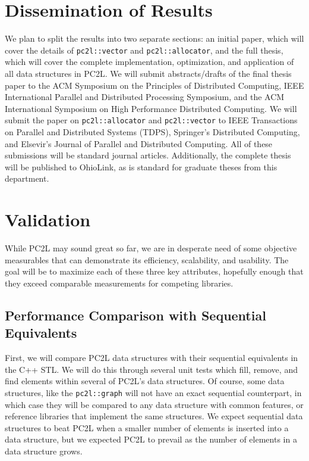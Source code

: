 \section{Dissemination of Results}
We plan to split the results into two separate sections: an initial paper, which will cover the details of \texttt{pc2l::vector} and \texttt{pc2l::allocator}, and the full thesis, which will cover the complete implementation, optimization, and application of all data structures in PC2L. We will submit abstracts/drafts of the final thesis paper to the ACM Symposium on the Principles of Distributed Computing, IEEE International Parallel and Distributed Processing Symposium, and the ACM International Symposium on High Performance Distributed Computing. We will submit the paper on \texttt{pc2l::allocator} and \texttt{pc2l::vector} to IEEE Transactions on Parallel and Distributed Systems (TDPS), Springer's Distributed Computing, and Elsevir's Journal of Parallel and Distributed Computing. All of these submissions will be standard journal articles. Additionally, the complete thesis will be published to OhioLink, as is standard for graduate theses from this department.

\section{Validation}

While PC2L may sound great so far, we are in desperate need of some objective measurables that can demonstrate its efficiency, scalability, and usability. The goal will be to maximize each of these three key attributes, hopefully enough that they exceed comparable measurements for competing libraries. 


\subsection{Performance Comparison with Sequential Equivalents}
First, we will compare PC2L data structures with their sequential equivalents in the C++ STL. We will do this through several unit tests which fill, remove, and find elements within several of PC2L's data structures. Of course, some data structures, like the \texttt{pc2l::graph} will not have an exact sequential counterpart, in which case they will be compared to any data structure with common features, or reference libraries that implement the same structures. We expect sequential data structures to beat PC2L when a smaller number of elements is inserted into a data structure, but we expected PC2L to prevail as the number of elements in a data structure grows. 

